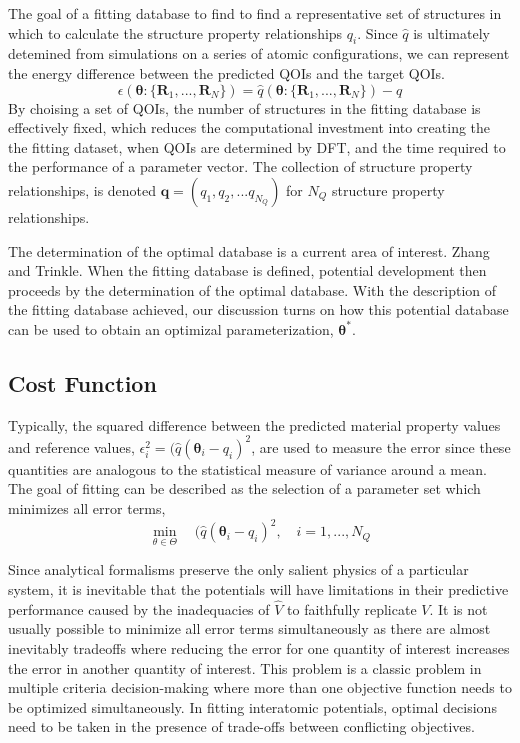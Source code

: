 The goal of a fitting database to find to find a representative set of structures in which to calculate the structure property relationships $q_i$.  Since $\hat{q}$ is ultimately detemined from simulations on a series of atomic configurations, we can represent the energy difference between the predicted QOIs and the target QOIs.
\begin{equation}
	\epsilon(\bm{\theta}:\{\bm{R}_1,...,\bm{R}_N\})=\hat{q}(\bm{\theta}:\{\bm{R}_1,...,\bm{R}_N\})-q
\end{equation}
By choising a set of QOIs, the number of structures in the fitting database is effectively fixed, which reduces the computational investment into creating the the fitting dataset, when QOIs are determined by DFT, and the time required to the performance of a parameter vector.  The collection of structure property relationships, is denoted $\bm{q}=(q_1,q_2,...q_{N_Q})$ for $N_Q$ structure property relationships.

The determination of the optimal database is a current area of interest.  Zhang and Trinkle\cite{zhang2015_bayes_fitttingdb}.  When the fitting database is defined, potential development then proceeds by the determination of the optimal database.  With the description of the fitting database achieved, our discussion turns on how this potential database can be used to obtain an optimizal parameterization, $\bm{\theta}^*$.

\subsection{Cost Function}
\label{subsec:cost_function}

Typically, the squared difference between the predicted material property values and reference values, $\epsilon_i^2=(\hat{q}(\bm{\theta}_i-q_i)^2$, are used to measure the error since these quantities are analogous to the statistical measure of variance around a mean. The goal of fitting can be described as the selection of a parameter set which minimizes all error terms,
\begin{equation}
\label{eq:moo_LS}
	\min_{\theta\in\Theta}
	          \quad  (\hat{q}(\bm{\theta}_i-q_i)^2,
						\quad i = 1,...,N_Q
\end{equation}

Since analytical formalisms preserve the only salient physics of a particular system, it is inevitable that the potentials will have limitations in their predictive performance caused by the inadequacies of $\hat{V}$ to faithfully replicate $V$.  It is not usually possible to minimize all error terms simultaneously as there are almost inevitably tradeoffs where reducing the error for one quantity of interest increases the error in another quantity of interest.  This problem is a classic problem in multiple criteria decision-making where more than one objective function needs to be optimized simultaneously\cite{miettinen1998_mcdm}.  In fitting interatomic potentials, optimal decisions need to be taken in the presence of trade-offs between conflicting objectives.

